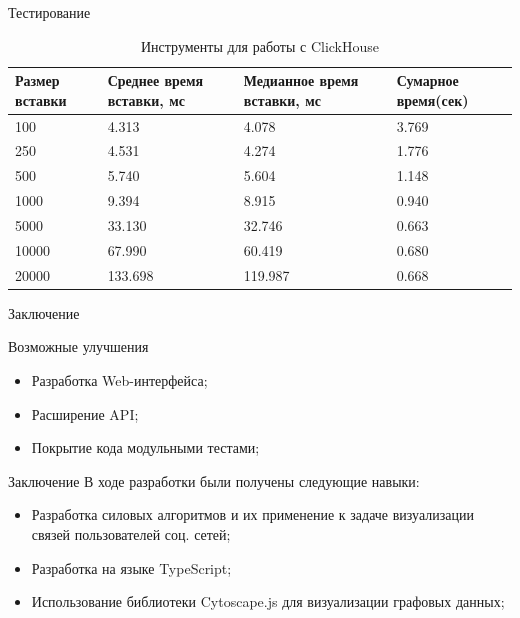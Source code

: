 \documentclass{beamer}
\begin{document}
\begin{frame}{Тестирование}
	\begin{table}[H]
		\caption{\centering Инструменты для работы с ClickHouse}
		\centering
		\begin{tabularx}{\textwidth}{|X|X|X|l|}
			\hline
			\textbf{Размер вставки} & \textbf{Среднее время вставки, мс} & \textbf{Медианное время вставки, мс} & \textbf{Сумарное время(сек)} \\ \hline
			100                     & 4.313                              & 4.078                                & 3.769                        \\ \hline
			250                     & 4.531                              & 4.274                                & 1.776                        \\ \hline
			500                     & 5.740                              & 5.604                                & 1.148                        \\ \hline
			1000                    & 9.394                              & 8.915                                & 0.940                        \\ \hline
			5000                    & 33.130                             & 32.746                               & 0.663                        \\ \hline
			10000                   & 67.990                             & 60.419                               & 0.680                        \\ \hline
			20000                   & 133.698                            & 119.987                              & 0.668                        \\ \hline
		\end{tabularx}
		\label{table:tests_results}
	\end{table}



\end{frame}



\begin{frame}{Заключение}
	\begin{alertblock}{Возможные улучшения}
		\begin{itemize}
			\item Разработка Web-интерфейса;
			\item Расширение API;
			\item Покрытие кода модульными тестами;
		\end{itemize}
	\end{alertblock}
\end{frame}

\begin{frame}{Заключение}
	В ходе разработки были получены следующие навыки:
	\begin{itemize}
		\item Разработка силовых алгоритмов и их применение к задаче визуализации связей пользователей соц. сетей;
		\item Разработка на языке TypeScript;
		\item Использование библиотеки Cytoscape.js для визуализации графовых данных;
	\end{itemize}
\end{frame}
\end{document}
